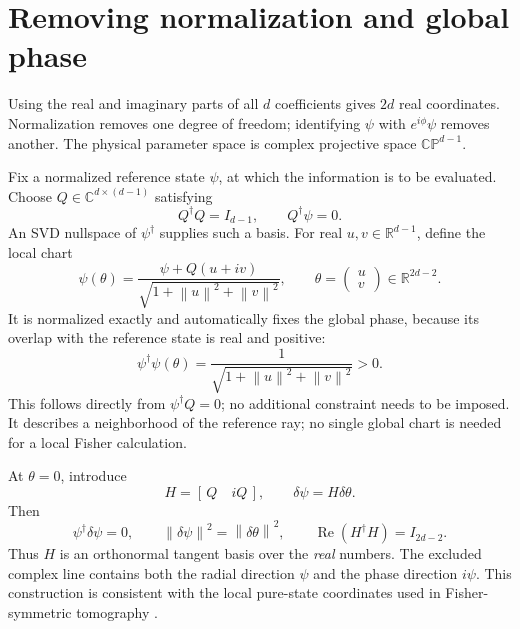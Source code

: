 \documentclass[11pt,a4paper]{article}
\newcommand{\C}{\mathbb C}
\newcommand{\R}{\mathbb R}
\newcommand{\RePart}{\operatorname{Re}}
\newcommand{\norm}[1]{\left\lVert#1\right\rVert}
\begin{document}
\section{Removing normalization and global phase}
Using the real and imaginary parts of all $d$ coefficients gives $2d$
real coordinates. Normalization removes one degree of freedom; identifying
$\psi$ with $e^{i\phi}\psi$ removes another. The physical parameter space is
complex projective space $\mathbb{CP}^{d-1}$.

Fix a normalized reference state $\psi$, at which the information is to be
evaluated. Choose $Q\in\C^{d\times(d-1)}$ satisfying
\begin{equation}
 Q^\dagger Q=I_{d-1},\qquad Q^\dagger\psi=0.
 \label{eq:Q}
\end{equation}
An SVD nullspace of $\psi^\dagger$ supplies such a basis. For real
$u,v\in\R^{d-1}$, define the local chart
\begin{equation}
 \psi(\theta)=\frac{\psi+Q(u+iv)}{\sqrt{1+\norm{u}^2+\norm{v}^2}},
 \qquad \theta=\begin{pmatrix}u\\v\end{pmatrix}\in\R^{2d-2}.
 \label{eq:chart}
\end{equation}
It is normalized exactly and automatically fixes the global phase, because
its overlap with the reference state is real and positive:
\begin{equation}
 \psi^\dagger\psi(\theta)
 =\frac{1}{\sqrt{1+\norm{u}^2+\norm{v}^2}}>0.
\end{equation}
This follows directly from $\psi^\dagger Q=0$; no additional constraint
needs to be imposed. It describes a neighborhood of the reference
ray; no single global chart is needed for a local Fisher calculation.

At $\theta=0$, introduce
\begin{equation}
 H=[\,Q\quad iQ\,],\qquad \delta\psi=H\delta\theta.
\end{equation}
Then
\begin{equation}
 \psi^\dagger\delta\psi=0,\qquad
 \norm{\delta\psi}^2=\norm{\delta\theta}^2,\qquad
 \RePart(H^\dagger H)=I_{2d-2}.
 \label{eq:metric}
\end{equation}
Thus $H$ is an orthonormal tangent basis over the \emph{real} numbers.
The excluded complex line contains both the radial direction $\psi$ and
the phase direction $i\psi$. This construction is consistent with the
local pure-state coordinates used in Fisher-symmetric tomography
\cite{li2016}.
\end{document}
